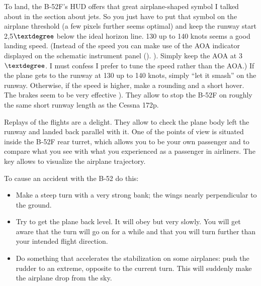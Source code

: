 To land, the B-52F's HUD offers that great airplane-shaped symbol I
talked about in the section about jets. So you just have to put that
symbol on the airplane threshold (a few pixels further seems optimal)
and keep the runway start 2,5$\textdegree$ below the ideal horizon
line. 130 up to 140 knots seems a good landing speed. (Instead of the
speed you can make use of the AOA indicator displayed on the schematic
instrument panel (). ). Simply keep the AOA at 3$\textdegree$. I
must confess I prefer to tune the speed rather than the AOA.) If the
plane gets to the runway at 130 up to 140 knots, simply ``let it
smash'' on the runway. Otherwise, if the speed is higher, make a
rounding and a short hover. The brakes seem to be very effective
). They allow to stop the B-52F on roughly the same short runway
length as the Cessna 172p.

Replays of the flights are a delight. They allow to check the plane
body left the runway and landed back parallel with it. One of the
points of view is situated inside the B-52F rear turret, which allows
you to be your own passenger and to compare what you see with what you
experienced as a passenger in airliners. The key  allows to
visualize the airplane trajectory.

To cause an accident with the B-52 do this:
\begin{itemize}
    \item Make a steep turn with a very strong bank; the wings nearly perpendicular to the ground.
    \item Try to get the plane back level. It will obey but very slowly. You will get aware that the turn will go on for a while and that you will turn further than your intended flight direction.
    \item Do something that accelerates the stabilization on some airplanes: push the rudder to an extreme, opposite to the current turn. This will suddenly make the airplane drop from the sky.
\end{itemize}


